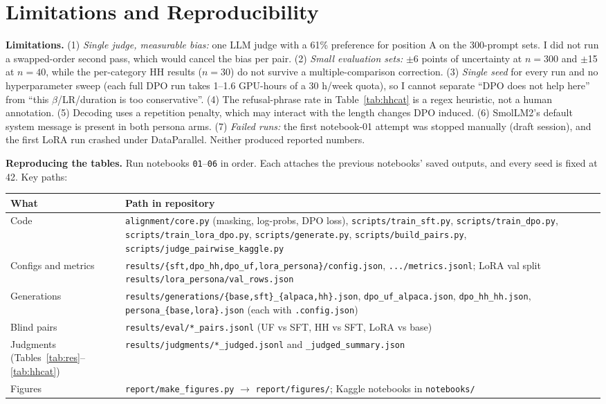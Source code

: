 \documentclass[10pt]{article}
\newcommand{\code}[1]{\texttt{\small #1}}
\begin{document}
\section{Limitations and Reproducibility}
\textbf{Limitations.} (1) \emph{Single judge, measurable bias:} one LLM judge with a 61\% preference for position A on the 300-prompt sets. I did not run a swapped-order second pass, which would cancel the bias per pair. (2) \emph{Small evaluation sets:} $\pm$6 points of uncertainty at $n=300$ and $\pm$15 at $n=40$, while the per-category HH results ($n=30$) do not survive a multiple-comparison correction. (3) \emph{Single seed} for every run and no hyperparameter sweep (each full DPO run takes 1--1.6 GPU-hours of a 30 h/week quota), so I cannot separate ``DPO does not help here'' from ``this $\beta$/LR/duration is too conservative''. (4) The refusal-phrase rate in Table~\ref{tab:hhcat} is a regex heuristic, not a human annotation. (5) Decoding uses a repetition penalty, which may interact with the length changes DPO induced. (6) SmolLM2's default system message is present in both persona arms. (7) \emph{Failed runs:} the first notebook-01 attempt was stopped manually (draft session), and the first LoRA run crashed under DataParallel. Neither produced reported numbers.

\textbf{Reproducing the tables.} Run notebooks \code{01}--\code{06} in order. Each attaches the previous notebooks' saved outputs, and every seed is fixed at 42. Key paths:

{\centering\footnotesize
\begin{tabularx}{\linewidth}{@{}l Y@{}}
\toprule
What & Path in repository \\
\midrule
Code & \code{alignment/core.py} (masking, log-probs, DPO loss), \code{scripts/train\_sft.py}, \code{scripts/train\_dpo.py}, \code{scripts/train\_lora\_dpo.py}, \code{scripts/generate.py}, \code{scripts/build\_pairs.py}, \code{scripts/judge\_pairwise\_kaggle.py} \\
Configs and metrics & \code{results/\{sft,dpo\_hh,dpo\_uf,lora\_persona\}/config.json}, \code{.../metrics.jsonl}; LoRA val split \code{results/lora\_persona/val\_rows.json} \\
Generations & \code{results/generations/\{base,sft\}\_\{alpaca,hh\}.json}, \code{dpo\_uf\_alpaca.json}, \code{dpo\_hh\_hh.json}, \code{persona\_\{base,lora\}.json} (each with \code{.config.json}) \\
Blind pairs & \code{results/eval/*\_pairs.jsonl} (UF vs SFT, HH vs SFT, LoRA vs base) \\
Judgments (Tables~\ref{tab:res}--\ref{tab:hhcat}) & \code{results/judgments/*\_judged.jsonl} and \code{*\_judged\_summary.json} \\
Figures & \code{report/make\_figures.py} $\to$ \code{report/figures/}; Kaggle notebooks in \code{notebooks/} \\
\bottomrule
\end{tabularx}\par}
\end{document}
